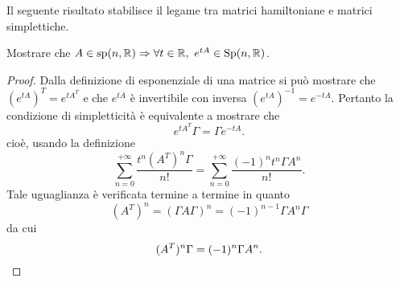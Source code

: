 Il seguente risultato stabilisce il legame tra matrici hamiltoniane e matrici simplettiche.

\begin{thm}
    Mostrare che $ A \in \mathrm{sp}(n, \mathbb{R}) \Rightarrow \forall t \in \mathbb{R}, \ e^{tA} \in \mathrm{Sp}(n, \mathbb{R}) $.
\end{thm}
\begin{proof}
    Dalla definizione di esponenziale di una matrice si può mostrare che $ (e^{tA})^T = e^{t A^T} $ e che $ e^{tA} $ è invertibile con inversa $ (e^{tA})^{-1} = e^{-tA} $. Pertanto la condizione di simpletticità è equivalente a mostrare che
    \[
        e^{tA^T} \Gamma = \Gamma e^{-tA}.
    \]
    cioè, usando la definizione
    \[ \sum_{n=0}^{+\infty} \frac{t^n (A^T)^n \Gamma}{n!} = \sum_{n=0}^{+\infty} \frac{(-1)^n t^n \Gamma A^n}{n!}. \]
    Tale uguaglianza è verificata termine a termine in quanto
    \[ (A^T)^n = (\Gamma A \Gamma)^n = (-1)^{n-1} \Gamma A^n \Gamma \]
    da cui
    \[ (A^T)^n \Gamma = (-1)^n \Gamma A^n. \qedhere \]
\end{proof}
